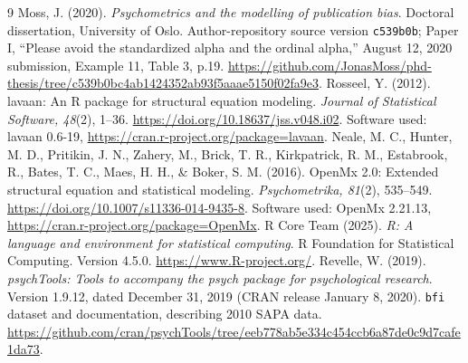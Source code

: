 \begin{thebibliography}{9}
 Moss, J. (2020). \emph{Psychometrics and the modelling of publication bias}. Doctoral dissertation, University of Oslo. Author-repository source version \texttt{c539b0b}; Paper I, ``Please avoid the standardized alpha and the ordinal alpha,'' August 12, 2020 submission, Example 11, Table 3, p.19. \url{https://github.com/JonasMoss/phd-thesis/tree/c539b0bc4ab1424352ab93f5aaae5150f02fa9e3}.
 Rosseel, Y. (2012). lavaan: An R package for structural equation modeling. \emph{Journal of Statistical Software, 48}(2), 1--36. \url{https://doi.org/10.18637/jss.v048.i02}. Software used: lavaan 0.6-19, \url{https://cran.r-project.org/package=lavaan}.
 Neale, M. C., Hunter, M. D., Pritikin, J. N., Zahery, M., Brick, T. R., Kirkpatrick, R. M., Estabrook, R., Bates, T. C., Maes, H. H., \& Boker, S. M. (2016). OpenMx 2.0: Extended structural equation and statistical modeling. \emph{Psychometrika, 81}(2), 535--549. \url{https://doi.org/10.1007/s11336-014-9435-8}. Software used: OpenMx 2.21.13, \url{https://cran.r-project.org/package=OpenMx}.
 R Core Team (2025). \emph{R: A language and environment for statistical computing}. R Foundation for Statistical Computing. Version 4.5.0. \url{https://www.R-project.org/}.
 Revelle, W. (2019). \emph{psychTools: Tools to accompany the psych package for psychological research}. Version 1.9.12, dated December 31, 2019 (CRAN release January 8, 2020). \texttt{bfi} dataset and documentation, describing 2010 SAPA data. \url{https://github.com/cran/psychTools/tree/eeb778ab5e334c454ccb6a87de0c9d7cafe1da73}.
\end{thebibliography}

